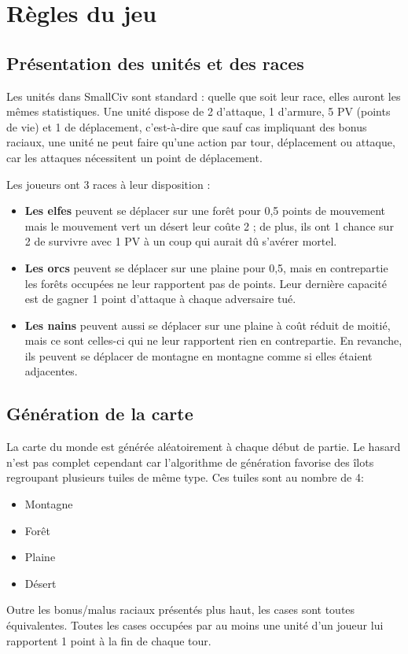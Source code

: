 \section{Règles du jeu}

\subsection{Présentation des unités et des races}
Les unités dans SmallCiv sont standard : quelle que soit leur race, elles auront les mêmes statistiques. Une unité dispose de 2 d'attaque, 1 d'armure, 5 PV (points de vie) et 1 de déplacement, c'est-à-dire que sauf cas impliquant des bonus raciaux, une unité ne peut faire qu'une action par tour, déplacement ou attaque, car les attaques nécessitent un point de déplacement. \newline

Les joueurs ont 3 races à leur disposition :
\begin{itemize}\renewcommand{\labelitemi}{$\bullet$}
\item \textbf{Les elfes} peuvent se déplacer sur une forêt pour 0,5 points de mouvement mais le mouvement vert un désert leur coûte 2 ; de plus, ils ont 1 chance sur 2 de survivre avec 1 PV à un coup qui aurait dû s'avérer mortel.
\item \textbf{Les orcs} peuvent se déplacer sur une plaine pour 0,5, mais en contrepartie les forêts occupées ne leur rapportent pas de points. Leur dernière capacité est de gagner 1 point d'attaque à chaque adversaire tué.
\item \textbf{Les nains} peuvent aussi se déplacer sur une plaine à coût réduit de moitié, mais ce sont celles-ci qui ne leur rapportent rien en contrepartie. En revanche, ils peuvent se déplacer de montagne en montagne comme si elles étaient adjacentes.
\end{itemize}

\subsection{Génération de la carte}
La carte du monde est générée aléatoirement à chaque début de partie. Le hasard n'est pas complet cependant car l'algorithme de génération favorise des îlots regroupant plusieurs tuiles de même type. Ces tuiles sont au nombre de 4:
\begin{itemize}
\item Montagne
\item Forêt
\item Plaine 
\item Désert
\end{itemize}
Outre les bonus/malus raciaux présentés plus haut, les cases sont toutes équivalentes. Toutes les cases occupées par au moins une unité d'un joueur lui rapportent 1 point à la fin de chaque tour. \newline

